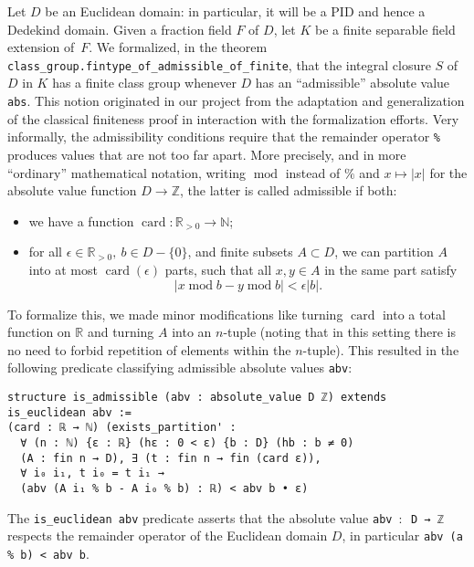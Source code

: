 \documentclass[sn-mathphys]{sn-jnl}%
\newcommand{\lean}[1]{\texttt{#1}\xspace}
\newcommand{\N}{\mathbb{N}}
\renewcommand{\R}{\mathbb{R}}
\renewcommand{\Z}{\mathbb{Z}}
\DeclareMathOperator{\card}{card}
\DeclareMathOperator{\Mod}{mod}
\begin{document}
Let $D$ be an Euclidean domain: in particular, it will be a PID and hence a Dedekind domain. Given a fraction field $F$ of $D$, let $K$ be a finite separable field extension of~$F$.
We formalized, in the theorem \lean{class\_group.fintype\_of\_\-admissible\_\-of\_finite}, that the integral closure $S$ of $D$ in $K$ has a finite class group whenever $D$ has an ``admissible'' absolute value \lean{abs}.
This notion originated in our project from the adaptation and generalization of the classical finiteness proof in interaction with the formalization efforts.
Very informally, the admissibility conditions require that the remainder operator \lean{\%} produces values that are not too far apart.
More precisely, and in more ``ordinary'' mathematical notation, writing $\Mod$ instead of $\%$ and $x \mapsto \lvert x \rvert $ for the absolute value function $D \to \Z$, the latter is called admissible if both:
\begin{itemize}
\item we have a function $\card: \R_{>0} \to \N$;
\item for all $\epsilon \in \R_{>0},\ b \in D-\{0\}$, and finite subsets $A \subset D$,
we can partition $A$
into at most $\card(\epsilon)$ parts, such that all
$x, y \in A$ in the same part satisfy
\[ \lvert x \Mod b - y \Mod b \rvert < \epsilon \lvert b \rvert.\]
\end{itemize}
To formalize this, we made minor modifications like turning $\card$ into a total function on $\R$ and turning $A$ into an $n$-tuple (noting that in this setting there is no need to forbid repetition of elements within the $n$-tuple).
This resulted in the following predicate classifying admissible absolute values \lean{abv}:
\begin{lstlisting}
structure is_admissible (abv : absolute_value D ℤ) extends is_euclidean abv :=
(card : ℝ → ℕ) (exists_partition' :
  ∀ (n : ℕ) {ε : ℝ} (hε : 0 < ε) {b : D} (hb : b ≠ 0)
  (A : fin n → D), ∃ (t : fin n → fin (card ε)),
  ∀ i₀ i₁, t i₀ = t i₁ →
  (abv (A i₁ % b - A i₀ % b) : ℝ) < abv b • ε)
\end{lstlisting}
The \lean{is\_euclidean abv} predicate asserts that the absolute value \lean{abv $:$ D → ℤ} respects the remainder operator of the Euclidean domain $D$, in particular \lean{abv (a \% b) < abv b}.
\end{document}
